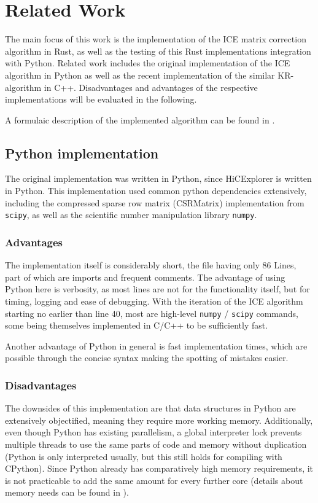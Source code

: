 \chapter{Related Work}\label{chap:relatedwork}

The main focus of this work is the implementation of the ICE matrix correction
algorithm in Rust, as well as the testing of this Rust implementations
integration with Python. Related work includes the original implementation of
the ICE algorithm in Python as well as the recent implementation of the
similar KR-algorithm in C++. Disadvantages and advantages of the respective
implementations will be evaluated in the following.

A formulaic description of the implemented algorithm can be found in
.


\section{Python implementation}\label{sec:python}

The original implementation was written in Python, since HiCExplorer is
written in Python. This implementation used common python dependencies
extensively, including the compressed sparse row matrix (CSRMatrix)
implementation from \verb|scipy|, as well as the scientific number manipulation
library \verb|numpy|.

\subsection{Advantages}

The implementation itself is considerably short, the file having only 86 Lines,
part of which are imports and frequent comments. The advantage of using Python
here is verbosity, as most lines are not for the functionality itself, but for
timing, logging and ease of debugging. With the iteration of the ICE algorithm
starting no earlier than line 40, most are high-level \verb|numpy| /
\verb|scipy| commands, some being themselves implemented in C/C++ to be
sufficiently fast.

Another advantage of Python in general is fast implementation times, which are
possible through the concise syntax making the spotting of mistakes easier.
\subsection{Disadvantages}

The downsides of this implementation are that data structures in Python are
extensively objectified, meaning they require more working memory. Additionally,
even though Python has existing parallelism, a global interpreter lock prevents
multiple threads to use the same parts of code and memory without duplication
(Python is only interpreted usually, but this still holds for compiling with
CPython). Since Python already has comparatively high memory requirements,
it is not practicable to add the same amount for every further core (details
about memory needs can be found in ).



